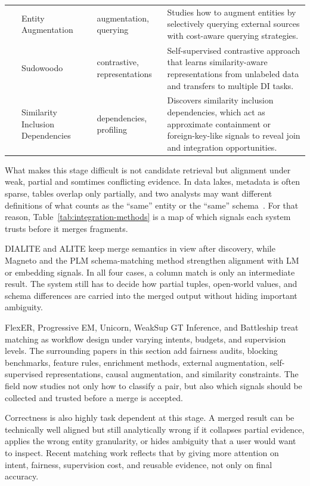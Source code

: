 \documentclass[sigconf]{acmart}
\begin{document}
\begin{table}[!htbp]
\begin{tabularx}{\textwidth}{@{}p{24mm}p{28mm}p{18mm}Y@{}}
~ &
Entity Augmentation~\cite{10.14778/3611479.3611535} &
augmentation, querying &
Studies how to augment entities by selectively querying external sources with cost-aware querying strategies. \\

~ &
Sudowoodo~\cite{10184556} &
contrastive, representations &
Self-supervised contrastive approach that learns similarity-aware representations from unlabeled data and transfers to multiple DI tasks. \\

~ &
Similarity Inclusion Dependencies~\cite{10.1145/3588929} &
dependencies, profiling &
Discovers similarity inclusion dependencies, which act as approximate containment or foreign-key-like signals to reveal join and integration opportunities. \\

\bottomrule
\end{tabularx}
\end{table}

What makes this stage difficult is not candidate retrieval but alignment under weak, partial and somtimes conflicting evidence. In data lakes, metadata is often sparse, tables overlap only partially, and two analysts may want different definitions of what counts as the ``same'' entity or the ``same'' schema~\cite{10.1145/3588722,10.14778/3742728.3742757,10.14778/3611479.3611525}. For that reason, Table~\ref{tab:integration-methods}  is a map of which signals each system trusts before it merges fragments.

DIALITE and ALITE keep merge semantics in view after discovery, while Magneto and the PLM schema-matching method strengthen alignment with LM or embedding signals. In all four cases, a column match is only an intermediate result. The system still has to decide how partial tuples, open-world values, and schema differences are carried into the merged output without hiding important ambiguity.

FlexER, Progressive EM, Unicorn, WeakSup GT Inference, and Battleship treat matching as workflow design under varying intents, budgets, and supervision levels. The surrounding papers in this section add fairness audits, blocking benchmarks, feature rules, enrichment methods, external augmentation, self-supervised representations, causal augmentation, and similarity constraints. The field now studies not only how to classify a pair, but also which signals should be collected and trusted before a merge is accepted.

Correctness is also highly task dependent at this stage. A merged result can be technically well aligned but still analytically wrong if it collapses partial evidence, applies the wrong entity granularity, or hides ambiguity that a user would want to inspect. Recent matching work reflects that by giving more attention on intent, fairness, supervision cost, and reusable evidence, not only on final accuracy.
\end{document}
